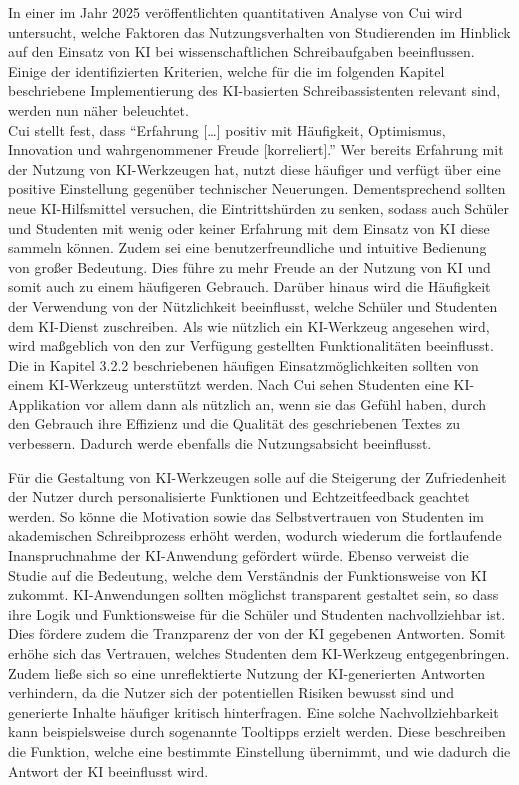 \documentclass[../main.tex]{subfiles}
\begin{document}
In einer im Jahr 2025 veröffentlichten quantitativen Analyse von Cui wird untersucht, welche Faktoren das Nutzungsverhalten von Studierenden im Hinblick auf den 
Einsatz von KI bei wissenschaftlichen Schreibaufgaben beeinflussen.\cite{influencingUsingAi} Einige der identifizierten Kriterien, welche für die im folgenden Kapitel 
beschriebene Implementierung des KI-basierten Schreibassistenten relevant sind, werden nun näher beleuchtet. \\ 

Cui stellt fest, dass "`Erfahrung […] positiv mit Häufigkeit, Optimismus, Innovation und wahrgenommener Freude [korreliert]."'\cite[6]{influencingUsingAi} Wer bereits 
Erfahrung mit der Nutzung von KI-Werkzeugen hat, nutzt diese häufiger und verfügt über eine positive Einstellung gegenüber technischer Neuerungen. Dementsprechend 
sollten neue KI-Hilfsmittel versuchen, die Eintrittshürden zu senken, sodass auch Schüler und Studenten mit wenig oder keiner Erfahrung mit dem Einsatz von KI diese 
sammeln können. Zudem sei eine benutzerfreundliche und intuitive Bedienung von großer Bedeutung\cite[6]{influencingUsingAi}. Dies führe zu mehr Freude an der Nutzung 
von KI und somit auch zu einem häufigeren Gebrauch. Darüber hinaus wird die Häufigkeit der Verwendung von der Nützlichkeit beeinflusst, welche Schüler und Studenten 
dem KI-Dienst zuschreiben. Als wie nützlich ein KI-Werkzeug angesehen wird, wird maßgeblich von den zur Verfügung gestellten Funktionalitäten beeinflusst. Die in 
Kapitel 3.2.2 beschriebenen häufigen Einsatzmöglichkeiten sollten von einem KI-Werkzeug unterstützt werden. Nach Cui sehen Studenten eine KI-Applikation vor allem dann 
als nützlich an, wenn sie das Gefühl haben, durch den Gebrauch ihre Effizienz und die Qualität des geschriebenen Textes zu verbessern. Dadurch werde ebenfalls die 
Nutzungsabsicht beeinflusst\cite[7]{influencingUsingAi}. 

Für die Gestaltung von KI-Werkzeugen solle auf die Steigerung der Zufriedenheit der Nutzer durch personalisierte Funktionen und Echtzeitfeedback geachtet 
werden\cite[10]{influencingUsingAi}. So könne die Motivation sowie das Selbstvertrauen von Studenten im akademischen Schreibprozess erhöht werden, wodurch 
wiederum die fortlaufende Inanspruchnahme der KI-Anwendung gefördert würde\cite[10]{influencingUsingAi}. Ebenso verweist die Studie auf die Bedeutung, welche dem 
Verständnis der Funktionsweise von KI zukommt. KI-Anwendungen sollten möglichst transparent gestaltet sein, so dass ihre Logik und Funktionsweise für die Schüler und 
Studenten nachvollziehbar ist. Dies fördere zudem die Tranzparenz der von der KI gegebenen Antworten. Somit erhöhe sich das Vertrauen, welches Studenten dem KI-Werkzeug 
entgegenbringen\cite[10]{influencingUsingAi}. Zudem ließe sich so eine unreflektierte Nutzung der KI-generierten Antworten verhindern, da die Nutzer sich der 
potentiellen Risiken bewusst sind und generierte Inhalte häufiger kritisch hinterfragen\cite[10]{influencingUsingAi}. Eine solche Nachvollziehbarkeit kann 
beispielsweise durch sogenannte Tooltipps erzielt werden. Diese beschreiben die Funktion, welche eine bestimmte Einstellung übernimmt, und wie dadurch die Antwort der 
KI beeinflusst wird.  
\end{document}
